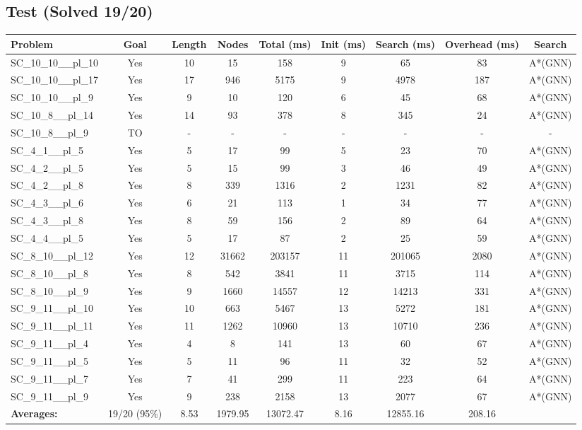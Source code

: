 \documentclass{article}
\begin{document}
\subsection*{Test (Solved 19/20)}
\begin{tabular}{lcccccccc}
\toprule
Problem & Goal & Length & Nodes & Total (ms) & Init (ms) & Search (ms) & Overhead (ms) & Search \\
\midrule
SC\_10\_10\_\_pl\_10 & Yes & 10 & 15 & 158 & 9 & 65 & 83 & A*(GNN) \\
SC\_10\_10\_\_pl\_17 & Yes & 17 & 946 & 5175 & 9 & 4978 & 187 & A*(GNN) \\
SC\_10\_10\_\_pl\_9 & Yes & 9 & 10 & 120 & 6 & 45 & 68 & A*(GNN) \\
SC\_10\_8\_\_pl\_14 & Yes & 14 & 93 & 378 & 8 & 345 & 24 & A*(GNN) \\
SC\_10\_8\_\_pl\_9 & TO & - & - & - & - & - & - & - \\
SC\_4\_1\_\_pl\_5 & Yes & 5 & 17 & 99 & 5 & 23 & 70 & A*(GNN) \\
SC\_4\_2\_\_pl\_5 & Yes & 5 & 15 & 99 & 3 & 46 & 49 & A*(GNN) \\
SC\_4\_2\_\_pl\_8 & Yes & 8 & 339 & 1316 & 2 & 1231 & 82 & A*(GNN) \\
SC\_4\_3\_\_pl\_6 & Yes & 6 & 21 & 113 & 1 & 34 & 77 & A*(GNN) \\
SC\_4\_3\_\_pl\_8 & Yes & 8 & 59 & 156 & 2 & 89 & 64 & A*(GNN) \\
SC\_4\_4\_\_pl\_5 & Yes & 5 & 17 & 87 & 2 & 25 & 59 & A*(GNN) \\
SC\_8\_10\_\_pl\_12 & Yes & 12 & 31662 & 203157 & 11 & 201065 & 2080 & A*(GNN) \\
SC\_8\_10\_\_pl\_8 & Yes & 8 & 542 & 3841 & 11 & 3715 & 114 & A*(GNN) \\
SC\_8\_10\_\_pl\_9 & Yes & 9 & 1660 & 14557 & 12 & 14213 & 331 & A*(GNN) \\
SC\_9\_11\_\_pl\_10 & Yes & 10 & 663 & 5467 & 13 & 5272 & 181 & A*(GNN) \\
SC\_9\_11\_\_pl\_11 & Yes & 11 & 1262 & 10960 & 13 & 10710 & 236 & A*(GNN) \\
SC\_9\_11\_\_pl\_4 & Yes & 4 & 8 & 141 & 13 & 60 & 67 & A*(GNN) \\
SC\_9\_11\_\_pl\_5 & Yes & 5 & 11 & 96 & 11 & 32 & 52 & A*(GNN) \\
SC\_9\_11\_\_pl\_7 & Yes & 7 & 41 & 299 & 11 & 223 & 64 & A*(GNN) \\
SC\_9\_11\_\_pl\_9 & Yes & 9 & 238 & 2158 & 13 & 2077 & 67 & A*(GNN) \\
\textbf{Averages:} & 19/20 (95\%) & 8.53 & 1979.95 & 13072.47 & 8.16 & 12855.16 & 208.16 & \\
\bottomrule
\end{tabular}
\\[0.7cm]
\end{document}
